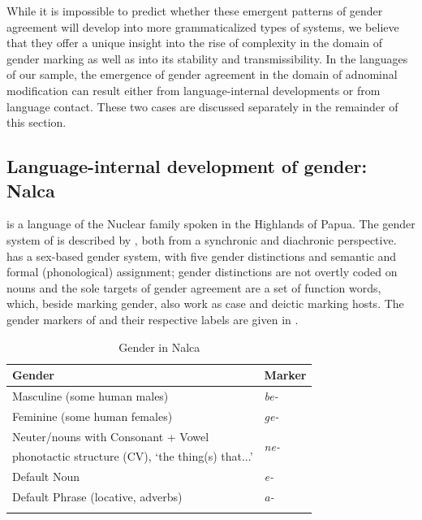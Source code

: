 \documentclass[output=collectionpaper]{langsci/langscibook}
\begin{document}
While it is impossible to predict whether these emergent patterns of gender agreement will develop into more grammaticalized types of systems, we believe that they offer a unique insight into the rise of complexity in the domain of gender marking as well as into its stability and transmissibility. In the languages of our sample, the emergence of gender agreement in the domain of adnominal modification can result either from language-internal developments or from language contact. These two cases are discussed separately in the remainder of this section.

\subsection{Language-internal development of gender: Nalca}
 is a  language of the Nuclear  family spoken in the Highlands of  Papua. The gender system of  is described by \citet{Waelchli2018}, both from a synchronic and diachronic perspective.  has a sex-based gender system, with five gender distinctions and semantic and formal (phonological) assignment; gender distinctions are not overtly coded on nouns and the sole targets of gender agreement are a set of function words, which, beside marking gender, also work as case and deictic marking hosts. The gender markers of  and their respective labels are given in .

 \begin{table}
\caption{Gender in Nalca}
\label{tab:4:Nalca}
 \begin{tabular}{ll} %
  \lsptoprule
Gender   & Marker \\ %
  \midrule
Masculine (some human males) & \textit{be-}\\
Feminine (some human females) & \textit{ge-} \\
Neuter/nouns with Consonant + Vowel  & \multirow{2}{*}{\textit{ne-}} \\
\quad phonotactic structure (CV), `the thing(s) that...' & \\
Default Noun & \textit{e-}\\
Default Phrase (locative, adverbs) & \textit{a-}\\
  \lspbottomrule
 \end{tabular}
\end{table}
\end{document}
